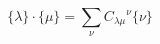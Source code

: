 \begin{equation}
{\{}\lambda {\}} \cdot {\{}\mu {\}} = \sum_{\nu} {C_{\lambda 
\mu}}^{\nu} {\{}\nu {\}}
\label{eq:LittlewoodRichardson}
\end{equation}


